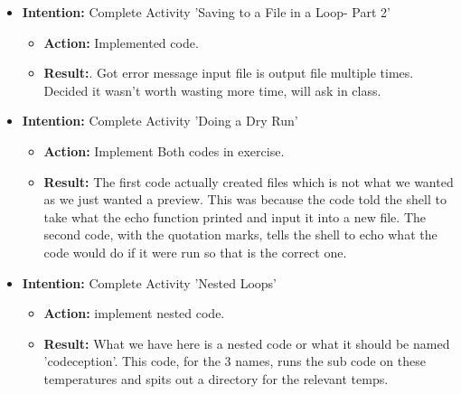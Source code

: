 \documentclass{article}
\begin{document}
\begin{itemize}
\begin{itemize}
\end{itemize}

\item{\textbf{Intention:} Complete Activity 'Saving to a File in a Loop- Part 2'}

\begin{itemize}
\item{\textbf{Action:} Implemented code.}

\item{\textbf{Result:}. Got error message input file is output file multiple times. Decided it wasn't worth wasting more time, will ask in class.}

\end{itemize}

\item{\textbf{Intention:} Complete Activity 'Doing a Dry Run'}

\begin{itemize}
\item{\textbf{Action:} Implement Both codes in exercise.}

\item{\textbf{Result:} The first code actually created files which is not what we wanted as we just wanted a preview. This was because the code told the shell to take what the echo function printed and input it into a new file. The second code, with the quotation marks, tells the shell to echo what the code would do if it were run so that is the correct one.}

\end{itemize}

\item{\textbf{Intention:} Complete Activity 'Nested Loops'}

\begin{itemize}
\item{\textbf{Action:} implement nested code.}

\item{\textbf{Result:} What we have here is a nested code or what it should be named 'codeception'. This code, for the 3 names, runs the sub code on these temperatures and spits out a directory for the relevant temps.}

\end{itemize}

\end{itemize}
\end{document}
